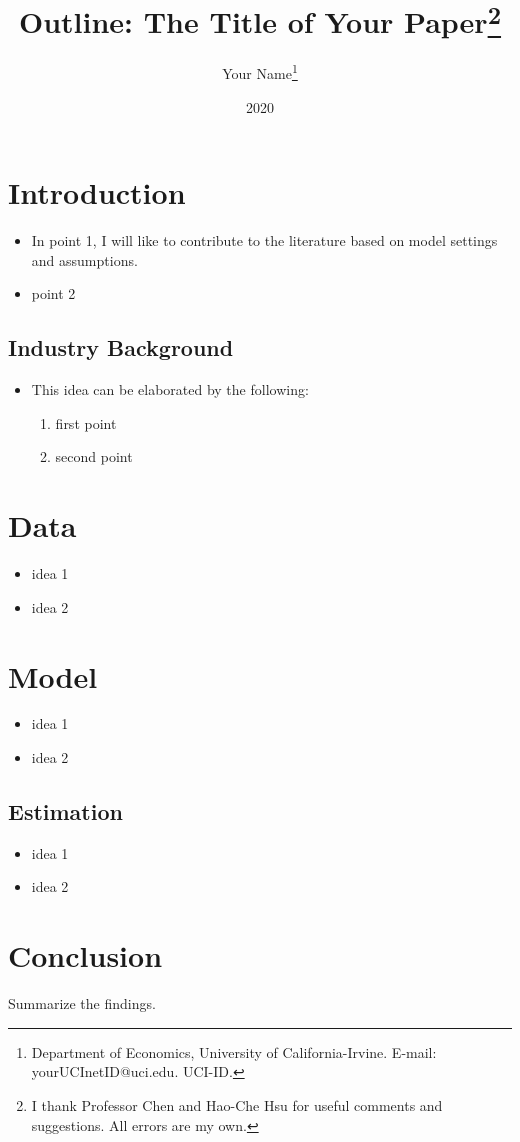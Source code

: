 \documentclass[12pt, letterpaper, oneside]{article}
\title{Outline: The Title of Your Paper\thanks{I thank Professor Chen and Hao-Che Hsu for useful comments and suggestions. All errors are my own.}}
\author{Your Name\footnote{Department of Economics, University of California-Irvine. E-mail: yourUCInetID@uci.edu. UCI-ID.}}
\date{2020}
\begin{document}
\doublespacing

\maketitle




\section{Introduction}
\begin{itemize}
    \item In point 1, I will like to contribute to the literature based on \citep{chen2018} model  settings and assumptions.
    \item point 2
\end{itemize}

\subsection{Industry Background}
\begin{itemize}
    \item This idea can be elaborated by the following:
    \begin{enumerate}
        \item first point \cite{web-io}
        \item second point
    \end{enumerate}
\end{itemize}

\section{Data}
\begin{itemize}
    \item idea 1
    \item idea 2
\end{itemize}

\section{Model}
\begin{itemize}
    \item idea 1
    \item idea 2
\end{itemize}

\subsection{Estimation}
\begin{itemize}
    \item idea 1
    \item idea 2
\end{itemize}

\section{Conclusion}
Summarize the findings.



\end{document}
